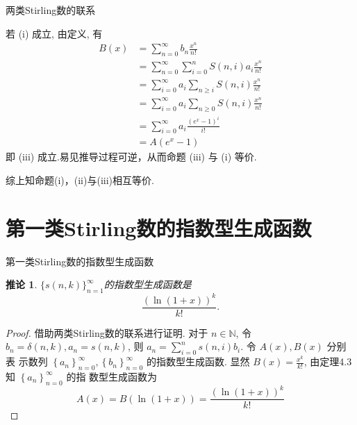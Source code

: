 \documentclass[punct]{ctexbeamer}
\newtheorem{cor}[thm]{推论}
\begin{document}
\begin{frame}{两类Stirling数的联系}

若 (i) 成立, 由定义, 有
$$
\begin{aligned}
B(x) &=\sum_{n=0}^{\infty} b_n \frac{x^n}{n !} \\
&=\sum_{n=0}^{\infty} \sum_{i=0}^n S(n, i) a_i \frac{x^n}{n !} \\
&=\sum_{i=0}^{\infty} a_i \sum_{n \geq i} S(n, i) \frac{x^n}{n !} \\
&=\sum_{i=0}^{\infty} a_i \sum_{n \geq 0} S(n, i) \frac{x^n}{n !} \\
&=\sum_{i=0}^{\infty} a_i \frac{\left(e^x-1\right)^i}{i !} \\
&=A\left(e^x-1\right)
\end{aligned}
$$
即 (iii) 成立.易见推导过程可逆，从而命题 (iii) 与 (i) 等价.

综上知命题(i)，(ii)与(iii)相互等价.
\end{frame}
\section{第一类Stirling数的指数型生成函数} 
\begin{frame}{第一类Stirling数的指数型生成函数}
	
	\begin{cor}
		$\{s(n,k)\}_{n=1}^{\infty}$的指数型生成函数是
		$$\frac{(\ln (1+x))^k}{k!}.$$
	\end{cor}
\pause
  \begin{proof}
  	借助两类Stirling数的联系进行证明.
  	对于 $n \in \mathbb{N}$, 令 $b_n=\delta(n, k), a_n=s(n, k)$, 则 $a_n=\sum_{i=0}^n s(n, i) b_i$. 令 $A(x), B(x)$ 分别表 示数列 $\left\{a_n\right\}_{n=0}^{\infty},\left\{b_n\right\}_{n=0}^{\infty}$ 的指数型生成函数. 显然 $B(x)=\frac{x^k}{k !}$, 由定理4.3知 $\left\{a_n\right\}_{n=0}^{\infty}$ 的指 数型生成函数为
  	$$
  	A(x)=B(\ln (1+x))=\frac{(\ln (1+x))^k}{k !}
  	$$
  \end{proof}
\end{frame}






	
	
	
	
	











   
   
   
   
\end{document}
